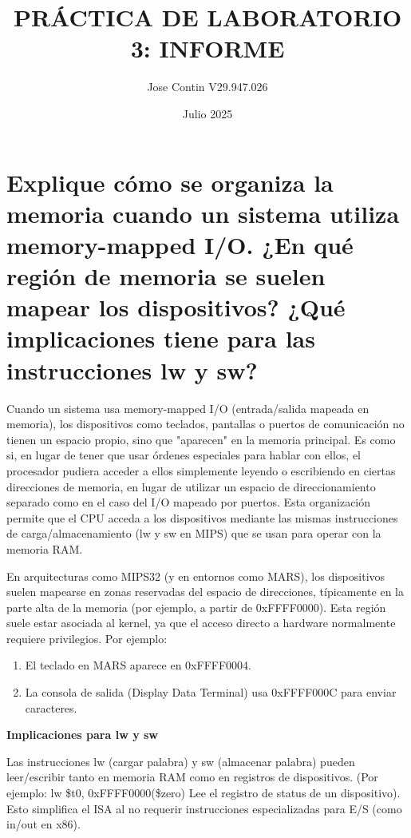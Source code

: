 \documentclass{article}
\title{PRÁCTICA DE LABORATORIO 3: INFORME}
\author{Jose Contin V29.947.026}
\date{Julio 2025}
\begin{document}
\maketitle

\begingroup
\raggedright

\section{Explique cómo se organiza la memoria cuando un sistema utiliza memory-mapped I/O.  ¿En qué región de memoria se suelen mapear los dispositivos? ¿Qué implicaciones tiene para las instrucciones lw y sw?}

\indent\indent Cuando un sistema usa memory-mapped I/O (entrada/salida mapeada en memoria), los dispositivos como teclados, pantallas o puertos de comunicación no tienen un espacio propio, sino que "aparecen" en la memoria principal. Es como si, en lugar de tener que usar órdenes especiales para hablar con ellos, el procesador pudiera acceder a ellos simplemente leyendo o escribiendo en ciertas direcciones de memoria, en lugar de utilizar un espacio de direccionamiento separado como en el caso del I/O mapeado por puertos. Esta organización permite que el CPU acceda a los dispositivos mediante las mismas instrucciones de carga/almacenamiento (lw y sw en MIPS) que se usan para operar con la memoria RAM. \newline

\noindent En arquitecturas como MIPS32 (y en entornos como MARS), los dispositivos suelen mapearse en zonas reservadas del espacio de direcciones, típicamente en la parte alta de la memoria (por ejemplo, a partir de 0xFFFF0000). Esta región suele estar asociada al kernel, ya que el acceso directo a hardware normalmente requiere privilegios. Por ejemplo:
\begin{enumerate}
\item El teclado en MARS aparece en 0xFFFF0004.
\item La consola de salida (Display Data Terminal) usa 0xFFFF000C para enviar caracteres.
\end{enumerate}

\textbf{Implicaciones para lw y sw}

Las instrucciones lw (cargar palabra) y sw (almacenar palabra) pueden leer/escribir tanto en memoria RAM como en registros de dispositivos. (Por ejemplo: lw \$t0, 0xFFFF0000(\$zero) Lee el registro de status de un dispositivo). Esto simplifica el ISA al no requerir instrucciones especializadas para E/S (como in/out en x86). \newline
\end{document}
